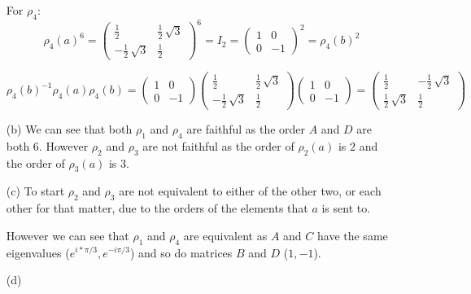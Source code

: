 \documentclass[10pt]{article}
\newcommand{\sk}{\vskip 10mm}
\theoremstyle{plain}
\theoremstyle{remark}
\begin{document}
\begin{enumerate}
  For $\rho_4$:
    \[
    \rho_4(a)^6=
\left(\begin{array}{rr}
\frac{1}{2} & \frac{1}{2} \, \sqrt{3} \\
-\frac{1}{2} \, \sqrt{3} & \frac{1}{2}
\end{array}\right)^6
    =
    I_2
    =
    \left(
      \begin{array}{rr}
        1 & 0 \\
        0 & -1
      \end{array}
    \right)^2
    =
    \rho_4(b)^2
  \]

  \[
    \rho_4(b)^{-1}\rho_4(a)\rho_4(b)
    =
    \left(
      \begin{array}{rr}
        1 & 0 \\
        0 & -1
      \end{array}
    \right)
    \left(\begin{array}{rr}
\frac{1}{2} & \frac{1}{2} \, \sqrt{3} \\
-\frac{1}{2} \, \sqrt{3} & \frac{1}{2}
\end{array}\right)
    \left(
      \begin{array}{rr}
        1 & 0 \\
        0 & -1
      \end{array}
    \right)
    =
    \left(\begin{array}{rr}
\frac{1}{2} & -\frac{1}{2} \, \sqrt{3} \\
\frac{1}{2} \, \sqrt{3} & \frac{1}{2}
\end{array}\right)
  \]

\item[(b)] We can see that both $\rho_1$ and $\rho_4$ are faithful
  as the order $A$ and $D$ are both 6. However $\rho_2$ and $\rho_3$
  are not faithful as the order of $\rho_2(a)$ is $2$ and the order of
  $\rho_3(a)$ is $3$.
\item[(c)] To start $\rho_2$ and $\rho_3$ are not equivalent to either of the
  other two, or each other for that matter, due to the orders of the elements
  that $a$ is sent to.

  However we can see that $\rho_1$ and $\rho_4$ are equivalent as $A$ and $C$ have the
  same eigenvalues ($e^{i*\pi/3},e^{-i\pi/3}$) and so do matrices $B$ and $D$ ($1,-1$).
\item[(d)]
\end{enumerate}

\sk
\end{document}
